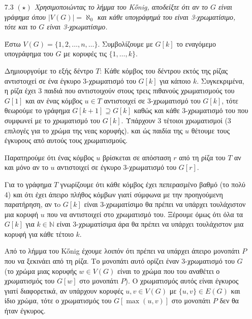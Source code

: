 \documentclass[a4paper, oneside, 11pt]{article}
\theoremstyle{definition}
\begin{document}
\begin{enumerate}
   \item[7.3] \emph{$(\star)$ Χρησιμοποιώντας το λήμμα του K\H{o}nig, αποδείξτε
   ότι αν το $G$ είναι γράφημα όπου $|V(G)| = \aleph_0$ και κάθε υπογράφημά
   του είναι 3-χρωματίσιμο, τότε και το $G$ είναι 3-χρωματίσιμο.}

   Έστω $V(G) = \{ 1, 2, \ldots, n, \ldots \}$. Συμβολίζουμε με $G[k]$
   το εναγόμεμο υπογράφημα του $G$ με κορυφές τις $\{1, \ldots, k\}$.

   Δημιουργούμε το εξής δέντρο $T$: Κάθε κόμβος του δέντρου εκτός της ρίζας
   αντιστοιχεί σε ένα έγκυρο 3-χρωματισμό του $G[k]$ για κάποιο $k$.
   Συγκεκριμένα, η ρίζα έχει 3 παιδιά που αντιστοιχούν στους τρεις πιθανούς
   χρωματισμούς του $G[1]$ και αν ένας κόμβος $u \in T$ αντιστοιχεί σε
   3-χρωματισμό
   του $G[k]$, τότε θεωρούμε το γράφημα $G[k+1] \supseteq G[k]$ καθώς και κάθε
   3-χρωματισμό του που συμφωνεί με το χρωματισμό του $G[k]$. Υπάρχουν
   3 τέτοιοι χρωματισμοί (3 επιλογές για το χρώμα της νεας κορυφής).
   και ώς παιδία της $u$ θέτουμε τους έγκυρους από αυτούς
   τους χρωματισμούς.

   Παρατηρούμε ότι ένας κόμβος $u$ βρίσκεται σε απόσταση $r$ από τη ρίζα
   του $T$ αν και μόνο αν το $u$ αντιστοιχεί σε έγκυρο 3-χρωματισμό
   του $G[r]$.

   Για το γράφημα $T$ γνωρίζουμε ότι κάθε κόμβος έχει πεπερασμένο βαθμό
   (το πολύ 4) και ότι έχει άπειρο πλήθος κόμβων γιατί σύμφωνα με την
   προηγούμενη παρατήρηση, αν τo $G[k]$ είναι 3-χρωματίσιμο θα πρέπει
   να υπάρχει τουλάχιστον μια κορυφή $u$ που να αντιστοιχεί στο
   χρωματισμό του. Ξέρουμε όμως ότι όλα τα $G[k]$ για $k \in \mathbb{N}$
   είναι 3-χρωματίσιμα άρα θα πρέπει να υπάρχει τουλάχιστον μια κορυφή
   για κάθε τέτοιο $k$.

   Από το λήμμα του K\H{o}nig έχουμε λοιπόν ότι πρέπει να υπάρχει άπειρο
   μονοπάτι $P$ που να ξεκινάει από τη ρίζα. Το μονοπάτι αυτό ορίζει
   έναν 3-χρωματισμό του $G$ (το χρώμα μιας κορυφής $w \in V(G)$
   είναι το χρώμα που του αναθέτει ο χρωματισμός του $G[w]$ στο μονοπάτι
   $P$). O χρωματισμός αυτός είναι έγκυρος γιατί διαφορετικά, αν υπάρχουν
   κορυφές $u, v \in V(G)$ με $\{u, v\} \in E(G)$ και ίδιο χρώμα, τότε
   ο χρωματισμός του $G[\max(u, v)]$ στο μονοπάτι $P$ δεν θα ήταν έγκυρος.
\end{enumerate}
\end{document}
